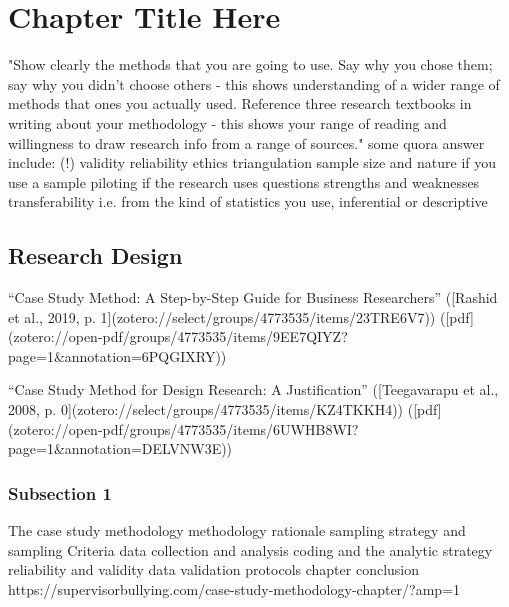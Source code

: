 
\chapter{Chapter Title Here} %

\label{ChapterX} %

"Show clearly the methods that you are going to use. Say why you chose them; say why you didn’t choose others - this shows understanding of a wider range of methods that ones you actually used. Reference three research textbooks in writing about your methodology - this shows your range of reading and willingness to draw research info from a range of sources." some quora answer
include: (!)
validity
reliability
ethics
triangulation
sample size and nature if you use a sample
piloting if the research uses questions
strengths and weaknesses
transferability i.e. from the kind of statistics you use, inferential or descriptive



\section{Research Design}

“Case Study Method: A Step-by-Step Guide for Business Researchers” ([Rashid et al., 2019, p. 1](zotero://select/groups/4773535/items/23TRE6V7)) ([pdf](zotero://open-pdf/groups/4773535/items/9EE7QIYZ?page=1&annotation=6PQGIXRY))

“Case Study Method for Design Research: A Justification” ([Teegavarapu et al., 2008, p. 0](zotero://select/groups/4773535/items/KZ4TKKH4)) ([pdf](zotero://open-pdf/groups/4773535/items/6UWHB8WI?page=1&annotation=DELVNW3E))
\subsection{Subsection 1}
The case study methodology
methodology rationale 
sampling strategy and sampling Criteria
data collection and analysis
coding and the analytic strategy
reliability and validity
data validation protocols
chapter conclusion
https://supervisorbullying.com/case-study-methodology-chapter/?amp=1


